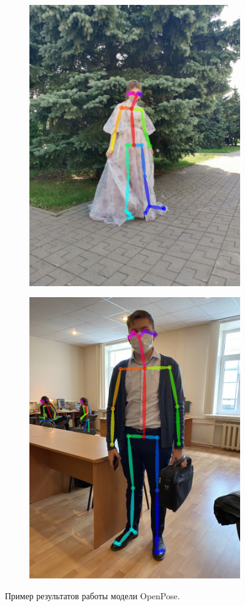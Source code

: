 \begin{figure}[h]
\begin{subfigure}[b]{.5\textwidth}
    \includegraphics[height=\textwidth]{./images/OpenPose/36}
    \caption{ }
\end{subfigure}
\begin{subfigure}[b]{.5\textwidth}
	\centering
    \includegraphics[height=\textwidth]{./images/OpenPose/33}
    \caption{ }
\end{subfigure}
    \caption{Пример результатов работы модели OpenPose.}
    \label{fig:OP_result}
\end{figure}

